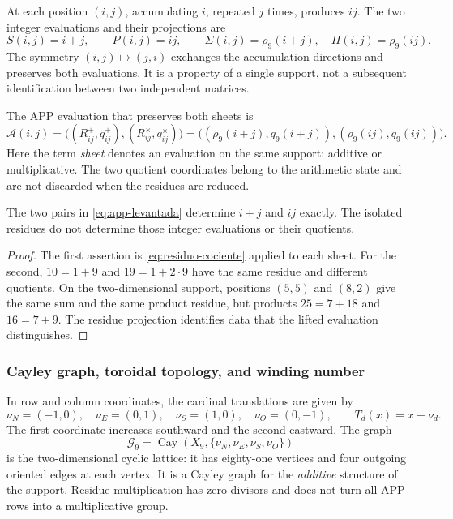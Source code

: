 At each position \((i,j)\), accumulating \(i\), repeated \(j\) times, produces \(ij\). The two integer evaluations and their projections are
\[
 S(i,j)=i+j,\qquad P(i,j)=ij,\qquad
 \Sigma(i,j)=\rho_9(i+j),\quad \Pi(i,j)=\rho_9(ij).
\]
The symmetry \((i,j)\mapsto(j,i)\) exchanges the accumulation directions and preserves both evaluations. It is a property of a single support, not a subsequent identification between two independent matrices.

\begin{definition}
The APP evaluation that preserves both sheets is
\begin{equation}
 \mathcal A(i,j)=
 \bigl((R^+_{ij},q^+_{ij}),(R^\times_{ij},q^\times_{ij})\bigr)
 =\bigl((\rho_9(i+j),q_9(i+j)),(\rho_9(ij),q_9(ij))\bigr).
 \label{eq:app-levantada}
\end{equation}
Here the term \emph{sheet} denotes an evaluation on the same support: additive or multiplicative. The two quotient coordinates belong to the arithmetic state and are not discarded when the residues are reduced.
\end{definition}



\begin{proposition}
The two pairs in \eqref{eq:app-levantada} determine \(i+j\) and \(ij\) exactly. The isolated residues do not determine those integer evaluations or their quotients.
\end{proposition}
\begin{proof}
The first assertion is \eqref{eq:residuo-cociente} applied to each sheet. For the second, \(10=1+9\) and \(19=1+2\cdot9\) have the same residue and different quotients. On the two-dimensional support, positions \((5,5)\) and \((8,2)\) give the same sum and the same product residue, but products \(25=7+18\) and \(16=7+9\). The residue projection identifies data that the lifted evaluation distinguishes.
\end{proof}

\subsubsection{Cayley graph, toroidal topology, and winding number}

In row and column coordinates, the cardinal translations are given by
\[
 \nu_N=(-1,0),\quad\nu_E=(0,1),\quad
 \nu_S=(1,0),\quad\nu_O=(0,-1),\qquad T_d(x)=x+\nu_d.
\]
The first coordinate increases southward and the second eastward. The graph
\[
 \mathscr G_9=\operatorname{Cay}(X_9,\{\nu_N,\nu_E,\nu_S,\nu_O\})
\]
is the two-dimensional cyclic lattice: it has eighty-one vertices and four outgoing oriented edges at each vertex. It is a Cayley graph for the \emph{additive} structure of the support. Residue multiplication has zero divisors and does not turn all APP rows into a multiplicative group.


